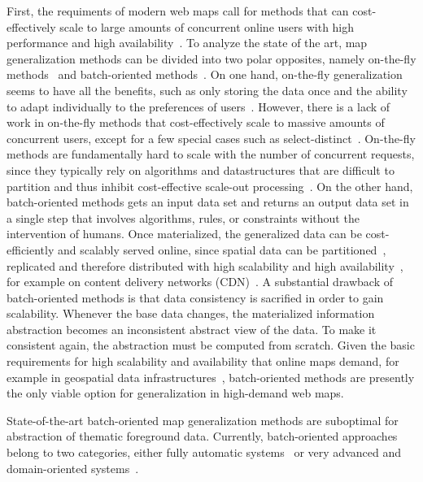 \documentclass[11pt, oneside]{report}
\begin{document}
First, the requiments of modern web maps call for methods that can cost-effectively scale to large amounts of concurrent online users with high performance and high availability~\cite{gst2014digitalmapsupply}. To analyze the state of the art, map generalization methods can be divided into two polar opposites, namely on-the-fly methods~\cite{bereuter2013real,van1995gap,nutanong2012multiresolution} and batch-oriented methods~\cite{schmid2013opensciencemap,haunert2006landcover,sarma2012fusiontables}. On one hand, on-the-fly generalization seems to have all the benefits, such as only storing the data once and the ability to adapt individually to the preferences of users~\cite{van1995gap}. However, there is a lack of work in on-the-fly methods that cost-effectively scale to massive amounts of concurrent users, except for a few special cases such as select-distinct~\cite{nutanong2012multiresolution}. On-the-fly methods are fundamentally hard to scale with the number of concurrent requests, since they typically rely on algorithms and datastructures that are difficult to partition and thus inhibit cost-effective scale-out processing~\cite{}. On the other hand, batch-oriented methods gets an input data set and returns an output data set in a single step that involves algorithms, rules, or constraints without the intervention of humans. Once materialized, the generalized data can be cost-efficiently and scalably served online, since spatial data can be partitioned~\cite{gaffuri12vectortiles,hilbert1891ueber,morton1966computer}, replicated and therefore distributed with high scalability and high availability~\cite{barroso2009datacenter}, for example on content delivery networks (CDN)~\cite{dilley2002cdn}. A substantial drawback of batch-oriented methods is that data consistency is sacrified in order to gain scalability. Whenever the base data changes, the materialized information abstraction becomes an inconsistent abstract view of the data. To make it consistent again, the abstraction must be computed from scratch. Given the basic requirements for high scalability and availability that online maps demand, for example in geospatial data infrastructures~\cite{gst2014digitalmapsupply}, batch-oriented methods are presently the only viable option for generalization in high-demand web maps. 

State-of-the-art batch-oriented map generalization methods are suboptimal for abstraction of thematic foreground data. %
Currently, batch-oriented approaches belong to two categories, either fully automatic systems~\cite{sarma2012fusiontables} or very advanced and domain-oriented systems~\cite{lamy1999application, ware2003generalization_sa}. %
\end{document}
